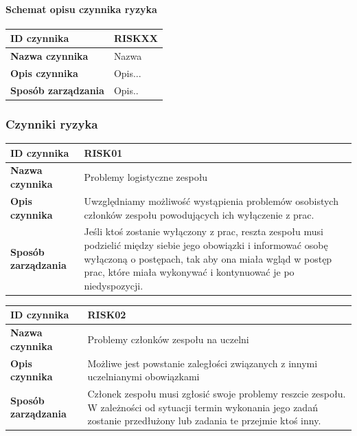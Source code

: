 \paragraph{Schemat opisu czynnika ryzyka}
\begin{center}
\begin{tabular}{|l|p{12cm}|}
\hline
\textbf{ID czynnika} &  RISKXX \tabularnewline \hline
\textbf{Nazwa czynnika} & Nazwa \tabularnewline \hline
\textbf{Opis czynnika} & Opis... \tabularnewline \hline
\textbf{Sposób zarządzania} & Opis.. \tabularnewline \hline
\end{tabular}
\end{center}

\subsubsection{Czynniki ryzyka}
\begin{center}
\begin{tabular}{|l|p{12cm}|}
\hline
\textbf{ID czynnika} &  RISK01 \tabularnewline \hline
\textbf{Nazwa czynnika} & Problemy logistyczne zespołu  \tabularnewline \hline
\textbf{Opis czynnika} & Uwzględniamy możliwość wystąpienia problemów osobistych członków zespołu powodujących ich wyłączenie z prac. \tabularnewline \hline
\textbf{Sposób zarządzania} & Jeśli ktoś zostanie wyłączony z prac, reszta zespołu musi podzielić między siebie jego obowiązki i informować osobę wyłączoną o postępach, tak aby ona miała wgląd w postęp prac, które miała wykonywać i kontynuować je po niedyspozycji.  \tabularnewline \hline
\end{tabular}
\end{center}


\begin{center}
\begin{tabular}{|l|p{12cm}|}
\hline
\textbf{ID czynnika} &  RISK02 \tabularnewline \hline
\textbf{Nazwa czynnika} & Problemy członków zespołu na uczelni \tabularnewline \hline
\textbf{Opis czynnika} & Możliwe jest powstanie zaległości związanych z innymi uczelnianymi obowiązkami    \tabularnewline \hline
\textbf{Sposób zarządzania} & Członek zespołu musi zgłosić swoje problemy reszcie zespołu. W zależności od sytuacji termin wykonania jego zadań zostanie przedłużony lub zadania te przejmie ktoś inny. \tabularnewline \hline
\end{tabular}
\end{center}

